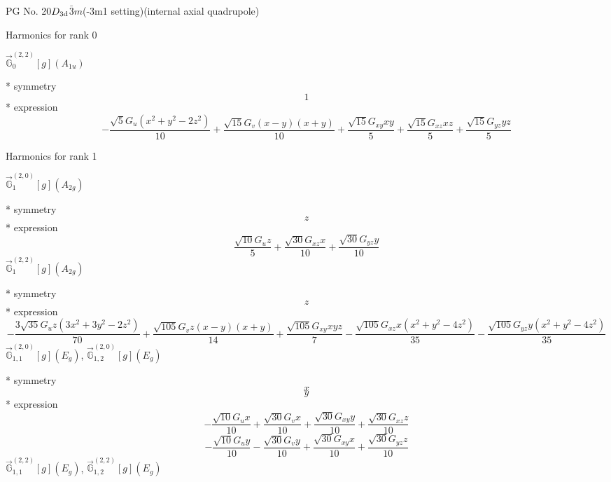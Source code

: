 \documentclass[fleqn,8pt]{jsarticle}
\begin{document}
\setcounter{MaxMatrixCols}{32}

\renewcommand{\tablename}{Table~}
\renewcommand{\figurename}{Figure~}
\begin{center}
\LARGE
PG No. 20\quad$D_{\rm 3d}$\quad$\bar{3}m$\quad(-3m1 setting)\quad[ trigonal ] (internal axial quadrupole)
\end{center}

\noindent * Harmonics for rank 0

\noindent\quad $\vec{\mathbb{G}}_{0}^{(2,2)}[g](A_{1u})$

\noindent\quad ** symmetry
\begin{dmath*}
1
\end{dmath*}
\noindent\quad ** expression
\begin{dmath*}
- \frac{\sqrt{5} G_{u} \left(x^{2} + y^{2} - 2 z^{2}\right)}{10} + \frac{\sqrt{15} G_{v} \left(x - y\right) \left(x + y\right)}{10} + \frac{\sqrt{15} G_{xy} x y}{5} + \frac{\sqrt{15} G_{xz} x z}{5} + \frac{\sqrt{15} G_{yz} y z}{5}
\end{dmath*}

\noindent * Harmonics for rank 1

\noindent\quad $\vec{\mathbb{G}}_{1}^{(2,0)}[g](A_{2g})$

\noindent\quad ** symmetry
\begin{dmath*}
z
\end{dmath*}
\noindent\quad ** expression
\begin{dmath*}
\frac{\sqrt{10} G_{u} z}{5} + \frac{\sqrt{30} G_{xz} x}{10} + \frac{\sqrt{30} G_{yz} y}{10}
\end{dmath*}
\noindent\quad $\vec{\mathbb{G}}_{1}^{(2,2)}[g](A_{2g})$

\noindent\quad ** symmetry
\begin{dmath*}
z
\end{dmath*}
\noindent\quad ** expression
\begin{dmath*}
- \frac{3 \sqrt{35} G_{u} z \left(3 x^{2} + 3 y^{2} - 2 z^{2}\right)}{70} + \frac{\sqrt{105} G_{v} z \left(x - y\right) \left(x + y\right)}{14} + \frac{\sqrt{105} G_{xy} x y z}{7} - \frac{\sqrt{105} G_{xz} x \left(x^{2} + y^{2} - 4 z^{2}\right)}{35} - \frac{\sqrt{105} G_{yz} y \left(x^{2} + y^{2} - 4 z^{2}\right)}{35}
\end{dmath*}
\noindent\quad $\vec{\mathbb{G}}_{1,1}^{(2,0)}[g](E_{g})$, $\vec{\mathbb{G}}_{1,2}^{(2,0)}[g](E_{g})$

\noindent\quad ** symmetry
\begin{dmath*}
x
\end{dmath*}
\begin{dmath*}
y
\end{dmath*}
\noindent\quad ** expression
\begin{dmath*}
- \frac{\sqrt{10} G_{u} x}{10} + \frac{\sqrt{30} G_{v} x}{10} + \frac{\sqrt{30} G_{xy} y}{10} + \frac{\sqrt{30} G_{xz} z}{10}
\end{dmath*}
\begin{dmath*}
- \frac{\sqrt{10} G_{u} y}{10} - \frac{\sqrt{30} G_{v} y}{10} + \frac{\sqrt{30} G_{xy} x}{10} + \frac{\sqrt{30} G_{yz} z}{10}
\end{dmath*}
\noindent\quad $\vec{\mathbb{G}}_{1,1}^{(2,2)}[g](E_{g})$, $\vec{\mathbb{G}}_{1,2}^{(2,2)}[g](E_{g})$
\end{document}

